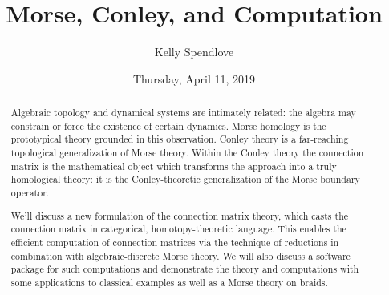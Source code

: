 \documentclass{UAmathtalk}
\author{Kelly Spendlove}
\title{Morse, Conley, and Computation}
\date{Thursday, April 11, 2019}
\begin{document}
\maketitle

\begin{abstract}
Algebraic topology and dynamical systems are intimately related: the algebra may constrain or force the existence of certain dynamics. Morse homology is the prototypical theory grounded in this observation. Conley theory is a far-reaching topological generalization of Morse theory. Within the Conley theory the connection matrix is the mathematical object which transforms the approach into a truly homological theory: it is the Conley-theoretic generalization of the Morse boundary operator.

We’ll discuss a new formulation of the connection matrix theory, which casts the connection matrix in categorical, homotopy-theoretic language.  This enables the efficient computation of connection matrices via the technique of reductions in combination with algebraic-discrete Morse theory. We will also discuss a software package for such computations and demonstrate the theory and computations with some applications to classical examples as well as a Morse theory on braids.
\end{abstract}
\end{document}
